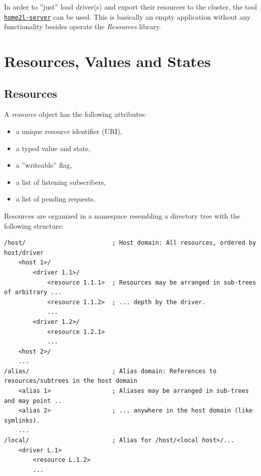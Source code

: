\documentclass[12pt,english,parskip=half]{scrreprt}
\newcommand{\idx}[1]{#1\index{#1}}
\newcommand{\toolref}[1]{\hyperref[tool:#1]{\texttt{\idx{#1}}}}
\begin{document}
In order to ''just'' load driver(s) and export their resources to the cluster, 
the tool \toolref{home2l-server} can be used.
This is basically an empty application without any functionality besides operate
the \emph{Resources} library.





\section{Resources, Values and States}
\label{sec:resources-resources}


\subsection{Resources}

A \emph{resource} object has the following attributes:

\begin{itemize}
\item
  a unique resource identifier (URI),
\item
  a typed value and state,
\item
  a ''writeable'' flag,
\item
  a list of listening subscribers,
\item
  a list of pending requests.
\end{itemize}

Resources are organized in a namespace resembling a directory tree with
the following structure:

\begin{lstlisting}
/host/                        ; Host domain: All resources, ordered by host/driver
    <host 1>/
        <driver 1.1>/
            <resource 1.1.1>  ; Resources may be arranged in sub-trees of arbitrary ...
            <resource 1.1.2>  ; ... depth by the driver.
            ...
        <driver 1.2>/
            <resource 1.2.1>
            ...
    <host 2>/
    ...
/alias/                       ; Alias domain: References to resources/subtrees in the host domain
    <alias 1>                 ; Aliases may be arranged in sub-trees and may point ..
    <alias 2>                 ; ... anywhere in the host domain (like symlinks).
    ...
/local/                       ; Alias for /host/<local host>/...
    <driver L.1>
        <resource L.1.2>
        ...
\end{lstlisting}
\end{document}
